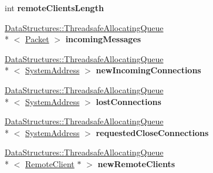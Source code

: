 \begin{DoxyCompactItemize}
\item 
\hypertarget{class_rak_net_1_1_t_c_p_interface_a31eeb0839eee81b0483804b6511c337a}{int {\bfseries remote\-Clients\-Length}}\label{class_rak_net_1_1_t_c_p_interface_a31eeb0839eee81b0483804b6511c337a}

\item 
\hypertarget{class_rak_net_1_1_t_c_p_interface_ac73b180836331c053702a3698caf6a8b}{\hyperlink{class_data_structures_1_1_threadsafe_allocating_queue}{Data\-Structures\-::\-Threadsafe\-Allocating\-Queue}\\*
$<$ \hyperlink{struct_rak_net_1_1_packet}{Packet} $>$ {\bfseries incoming\-Messages}}\label{class_rak_net_1_1_t_c_p_interface_ac73b180836331c053702a3698caf6a8b}

\item 
\hypertarget{class_rak_net_1_1_t_c_p_interface_a2edd8e6a28e0828f65627422391c318a}{\hyperlink{class_data_structures_1_1_threadsafe_allocating_queue}{Data\-Structures\-::\-Threadsafe\-Allocating\-Queue}\\*
$<$ \hyperlink{struct_rak_net_1_1_system_address}{System\-Address} $>$ {\bfseries new\-Incoming\-Connections}}\label{class_rak_net_1_1_t_c_p_interface_a2edd8e6a28e0828f65627422391c318a}

\item 
\hypertarget{class_rak_net_1_1_t_c_p_interface_a4a406154ea873b74d54d1b880ab5c338}{\hyperlink{class_data_structures_1_1_threadsafe_allocating_queue}{Data\-Structures\-::\-Threadsafe\-Allocating\-Queue}\\*
$<$ \hyperlink{struct_rak_net_1_1_system_address}{System\-Address} $>$ {\bfseries lost\-Connections}}\label{class_rak_net_1_1_t_c_p_interface_a4a406154ea873b74d54d1b880ab5c338}

\item 
\hypertarget{class_rak_net_1_1_t_c_p_interface_abe06759a0fc2554d2884d253ce4b7a8a}{\hyperlink{class_data_structures_1_1_threadsafe_allocating_queue}{Data\-Structures\-::\-Threadsafe\-Allocating\-Queue}\\*
$<$ \hyperlink{struct_rak_net_1_1_system_address}{System\-Address} $>$ {\bfseries requested\-Close\-Connections}}\label{class_rak_net_1_1_t_c_p_interface_abe06759a0fc2554d2884d253ce4b7a8a}

\item 
\hypertarget{class_rak_net_1_1_t_c_p_interface_af7803ff8fd7c50a3f67821dc305c9831}{\hyperlink{class_data_structures_1_1_threadsafe_allocating_queue}{Data\-Structures\-::\-Threadsafe\-Allocating\-Queue}\\*
$<$ \hyperlink{struct_rak_net_1_1_remote_client}{Remote\-Client} $\ast$ $>$ {\bfseries new\-Remote\-Clients}}\label{class_rak_net_1_1_t_c_p_interface_af7803ff8fd7c50a3f67821dc305c9831}


\end{DoxyCompactItemize}
